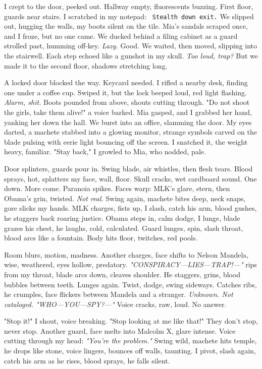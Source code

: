 \documentclass[12pt]{article}
\newcommand{\note}[1]{\texttt{\small \color{DarkGray} #1}}
\begin{document}
I crept to the door, peeked out. Hallway empty, fluorescents buzzing. First floor, guards near stairs. I scratched in my notepad: \note{Stealth down exit.} We slipped out, hugging the walls, my boots silent on the tile. \textnormal{Mia}’s sandals scraped once, and I froze, but no one came. We ducked behind a filing cabinet as a guard strolled past, humming off-key. \textit{Lazy.} Good. We waited, then moved, slipping into the stairwell. Each step echoed like a gunshot in my skull. \textit{Too loud, trap?} But we made it to the second floor, shadows stretching long.

A locked door blocked the way. Keycard needed. I rifled a nearby desk, finding one under a coffee cup. Swiped it, but the lock beeped loud, red light flashing. \textit{Alarm, shit.} Boots pounded from above, shouts cutting through. "Do not shoot the girls, take them alive!" a voice barked. \textnormal{Mia} gasped, and I grabbed her hand, yanking her down the hall. We burst into an office, slamming the door. My eyes darted, a machete stabbed into a glowing monitor, strange symbols carved on the blade pulsing with eerie light bouncing off the screen. I snatched it, the weight heavy, familiar. "Stay back," I growled to \textnormal{Mia}, who nodded, pale.

Door splinters, guards pour in. Swing blade, air whistles, then flesh tears. Blood sprays, hot, splatters my face, wall, floor. Skull cracks, wet cardboard sound. One down. More come. Paranoia spikes. Faces warp: \textnormal{MLK}’s glare, stern, then \textnormal{Obama}’s grin, twisted. \textit{Not real.} Swing again, machete bites deep, neck snaps, gore slicks my hands. \textnormal{MLK} charges, fists up, I slash, catch his arm, blood gushes, he staggers back roaring justice. \textnormal{Obama} steps in, calm dodge, I lunge, blade grazes his chest, he laughs, cold, calculated. Guard lunges, spin, slash throat, blood arcs like a fountain. Body hits floor, twitches, red pools.

Room blurs, motion, madness. Another charges, face shifts to \textnormal{Nelson Mandela}, wise, weathered, eyes hollow, predatory. \textit{"CONSPIRACY—LIES—TRAP!—"} rips from my throat, blade arcs down, cleaves shoulder. He staggers, grins, blood bubbles between teeth. Lunges again. Twist, dodge, swing sideways. Catches ribs, he crumples, face flickers between \textnormal{Mandela} and a stranger. \textit{Unknown. Not cataloged.} \textit{"WHO—YOU—SPY?—"} Voice cracks, raw, loud. No answer.

"Stop it!" I shout, voice breaking. "Stop looking at me like that!" They don’t stop, never stop. Another guard, face melts into \textnormal{Malcolm X}, glare intense. Voice cutting through my head: \textit{"You’re the problem."} Swing wild, machete hits temple, he drops like stone, voice lingers, bounces off walls, taunting. I pivot, slash again, catch his arm as he rises, blood sprays, he falls silent.
\end{document}
